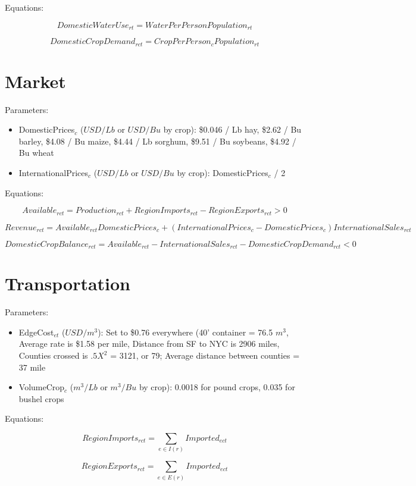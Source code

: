 \documentclass[11pt,oneside, landscape]{amsart}
\begin{document}
Equations:

\[
DomesticWaterUse_{rt} = WaterPerPerson Population_{rt}
\]

\[
DomesticCropDemand_{rct} = CropPerPerson_c Population_{rt}
\]

\section{Market}

Parameters:

\begin{itemize}
\item DomesticPrices$_c$ ($USD / Lb$ or $USD / Bu$ by crop): \$0.046 /
  Lb hay, \$2.62 / Bu barley, \$4.08 / Bu maize, \$4.44 / Lb sorghum,
  \$9.51 / Bu soybeans, \$4.92 / Bu wheat
\item InternationalPrices$_c$ ($USD / Lb$ or $USD / Bu$ by crop):
  DomesticPrices$_c$ / 2
\end{itemize}

Equations:

\[
Available_{rct} = Production_{rct} + RegionImports_{rct} -
RegionExports_{rct} > 0
\]

\[
Revenue_{rct} = Available_{rct} DomesticPrices_c +
(InternationalPrices_c - DomesticPrices_c)
InternationalSales_{rct}
\]

\[
DomesticCropBalance_{rct} = Available_{rct} - InternationalSales_{rct}
- DomesticCropDemand_{rct} < 0
\]

\section{Transportation}

Parameters:

\begin{itemize}
\item EdgeCost$_{et}$ ($USD / m^3$): Set to \$0.76 everywhere (40'
  container = 76.5 $m^3$, Average rate is \$1.58 per mile, Distance
  from SF to NYC is 2906 miles, Counties crossed is $.5 X^2$ = 3121,
  or 79; Average distance between counties = 37 mile
\item VolumeCrop$_c$ ($m^3 / Lb$ or $m^3 / Bu$ by crop): \num{0.0018}
  for pound crops, 0.035 for bushel crops
\end{itemize}

Equations:

\[
RegionImports_{rct} = \sum_{e \in I(r)} Imported_{ect}
\]

\[
RegionExports_{rct} = \sum_{e \in E(r)} Imported_{ect}
\]
\end{document}

